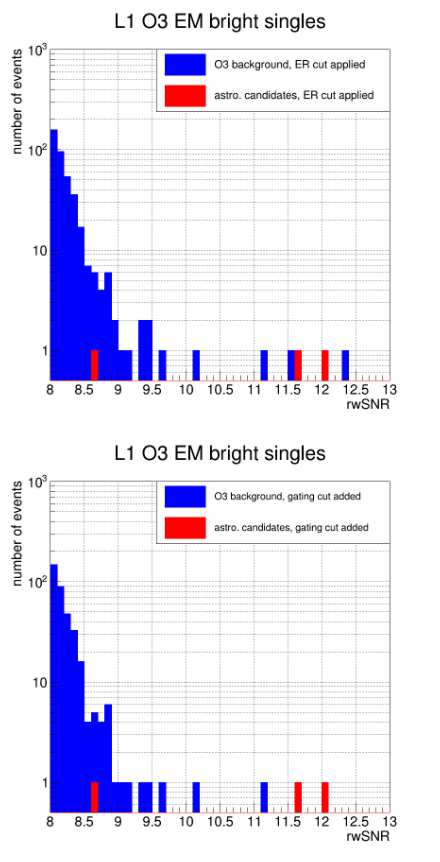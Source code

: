 \begin{figure}
  \centering
  \begin{minipage}{0.45\linewidth}
    \centering
    \includegraphics[width=\linewidth]{sectionSelection/plotsEMbright/cL1_O3_afterCutER.png}
    \label{fig:embright_astro_aftercutER}
  \end{minipage}
  \hfill
  \begin{minipage}{0.45\linewidth}
    \centering
    \includegraphics[width=\linewidth]{sectionSelection/plotsEMbright/cL1_O3_afterCutGating.png}

\end{minipage}
\end{figure}
